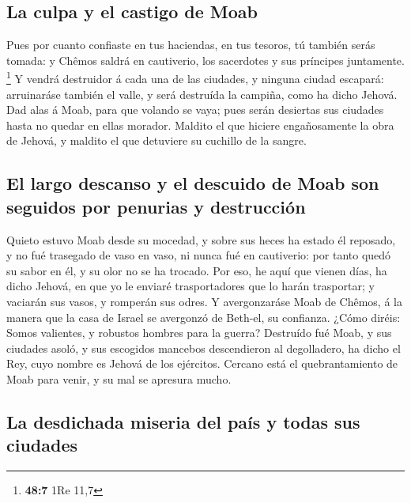 \hypertarget{la-culpa-y-el-castigo-de-moab}{%
\subsection{La culpa y el castigo de
Moab}\label{la-culpa-y-el-castigo-de-moab}}

 Pues por cuanto confiaste en tus haciendas, en tus tesoros,
tú también serás tomada: y Chêmos saldrá en cautiverio, los sacerdotes y
sus príncipes juntamente. \footnote{\textbf{48:7} 1Re 11,7} 
Y vendrá destruidor á cada una de las ciudades, y ninguna ciudad
escapará: arruinaráse también el valle, y será destruída la campiña,
como ha dicho Jehová.  Dad alas á Moab, para que volando se
vaya; pues serán desiertas sus ciudades hasta no quedar en ellas
morador.  Maldito el que hiciere engañosamente la obra de
Jehová, y maldito el que detuviere su cuchillo de la sangre.

\hypertarget{el-largo-descanso-y-el-descuido-de-moab-son-seguidos-por-penurias-y-destrucciuxf3n}{%
\subsection{El largo descanso y el descuido de Moab son seguidos por
penurias y
destrucción}\label{el-largo-descanso-y-el-descuido-de-moab-son-seguidos-por-penurias-y-destrucciuxf3n}}

 Quieto estuvo Moab desde su mocedad, y sobre sus heces ha
estado él reposado, y no fué trasegado de vaso en vaso, ni nunca fué en
cautiverio: por tanto quedó su sabor en él, y su olor no se ha trocado.
 Por eso, he aquí que vienen días, ha dicho Jehová, en que
yo le enviaré trasportadores que lo harán trasportar; y vaciarán sus
vasos, y romperán sus odres.  Y avergonzaráse Moab de
Chêmos, á la manera que la casa de Israel se avergonzó de Beth-el, su
confianza.  ¿Cómo diréis: Somos valientes, y robustos
hombres para la guerra?  Destruído fué Moab, y sus ciudades
asoló, y sus escogidos mancebos descendieron al degolladero, ha dicho el
Rey, cuyo nombre es Jehová de los ejércitos.  Cercano está
el quebrantamiento de Moab para venir, y su mal se apresura mucho.

\hypertarget{la-desdichada-miseria-del-pauxeds-y-todas-sus-ciudades}{%
\subsection{La desdichada miseria del país y todas sus
ciudades}\label{la-desdichada-miseria-del-pauxeds-y-todas-sus-ciudades}}

